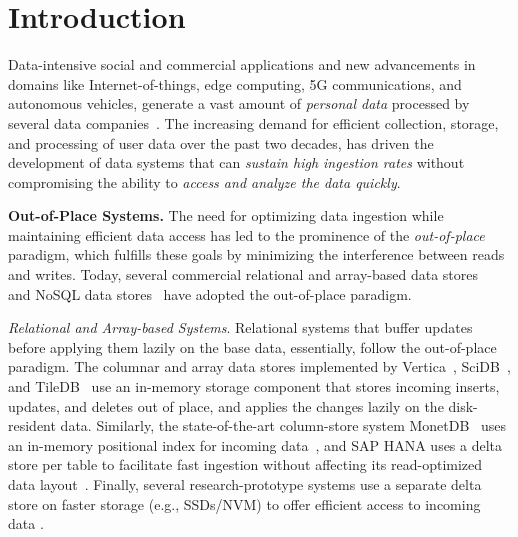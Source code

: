 \documentclass[11pt,dvipdfmx]{article}
\newcommand\Paragraph[1]{\vspace{0.02in}  \noindent \textbf{#1.}}
\begin{document}
\section{Introduction}
\label{sec:introduction}


Data-intensive social and commercial applications and new advancements in domains like Internet-of-things, edge computing, 5G communications, and autonomous vehicles, generate a vast amount of \textit{personal data} processed by several data companies~\cite{Cisco2018,Gartner2017}. 
The increasing demand for efficient collection, storage, and processing of user data over the past two decades, has driven the development of data systems that can \textit{sustain high ingestion rates} without compromising the ability to \textit{access and analyze the data quickly}. 

\newpage
\Paragraph{Out-of-Place Systems}
The need for optimizing data ingestion while maintaining efficient data access has led
to the prominence of the \textit{out-of-place} paradigm, which fulfills these goals by
minimizing the interference between reads and writes. Today, several commercial relational and 
array-based data 
stores~\cite{Athanassoulis2011,Deng2020,Farber2012,Heman2010,Idreos2012,Kang2016,Lamb2012,Sadoghi2016,Stonebraker2005} and NoSQL data 
stores~\cite{ApacheAccumulo,ApacheCassandra,ApacheHBase,DeCandia2007,FacebookRocksDB,Golan-Gueta2015,Huang2019,Sears2012} have adopted the out-of-place paradigm. 

\textit{Relational and Array-based Systems}. 
Relational systems that buffer updates before applying them lazily on the base data, essentially, follow the out-of-place paradigm. 
The columnar and array data stores implemented by Vertica~\cite{Lamb2012,Stonebraker2005}, 
SciDB~\cite{Paradigm4,Stonebraker2013}, and TileDB~\cite{Papadopoulos2016,TileDB} use an in-memory storage component that stores incoming inserts, updates, and deletes out of place, and 
applies the changes lazily on the disk-resident data. Similarly, the state-of-the-art column-store system
MonetDB~\cite{Idreos2012} uses an in-memory positional index for incoming 
data~\cite{Heman2010}, and SAP HANA uses
a delta store per table to facilitate fast ingestion without affecting its 
read-optimized data layout~\cite{Farber2012}. 
Finally, several research-prototype systems
use a separate delta store on faster storage (e.g., SSDs/NVM) to 
offer efficient access to incoming 
data \cite{Athanassoulis2011,Athanassoulis2015,Deng2020,Kang2016,Sadoghi2016}.
\end{document}
